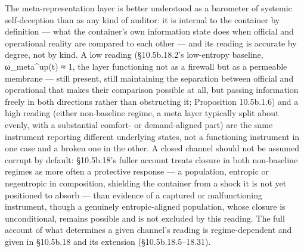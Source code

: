 \documentclass[
]{article}
\begin{document}
The meta-representation layer is better understood as a barometer of
systemic self-deception than as any kind of auditor: it is internal to
the container by definition --- what the container's own information
state does when official and operational reality are compared to each
other --- and its reading is accurate by degree, not by kind. A low
reading (§10.5b.18.2's low-entropy baseline, ω\_meta\^{}up(t) ≈ 1, the
layer functioning not as a firewall but as a permeable membrane ---
still present, still maintaining the separation between official and
operational that makes their comparison possible at all, but passing
information freely in both directions rather than obstructing it;
Proposition 10.5b.1.6) and a high reading (either non-baseline regime, a
meta layer typically split about evenly, with a substantial comfort- or
demand-aligned part) are the same instrument reporting different
underlying states, not a functioning instrument in one case and a broken
one in the other. A closed channel should not be assumed corrupt by
default: §10.5b.18's fuller account treats closure in both non-baseline
regimes as more often a protective response --- a population, entropic
or negentropic in composition, shielding the container from a shock it
is not yet positioned to absorb --- than evidence of a captured or
malfunctioning instrument, though a genuinely entropic-aligned
population, whose closure is unconditional, remains possible and is not
excluded by this reading. The full account of what determines a given
channel's reading is regime-dependent and given in §10.5b.18 and its
extension (§10.5b.18.5--18.31).
\end{document}
